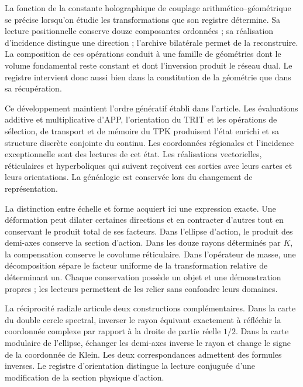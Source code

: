 \label{x_reciprocidad:rec:apertura}

La fonction de la constante holographique de couplage arithmético--géométrique se précise lorsqu'on étudie les transformations que son registre détermine. Sa lecture positionnelle conserve douze composantes ordonnées ; sa réalisation d'incidence distingue une direction ; l'archive bilatérale permet de la reconstruire. La composition de ces opérations conduit à une famille de géométries dont le volume fondamental reste constant et dont l'inversion produit le réseau dual. Le registre intervient donc aussi bien dans la constitution de la géométrie que dans sa récupération.

Ce développement maintient l’ordre génératif établi dans l’article. Les évaluations additive et multiplicative d’APP, l’orientation du TRIT et les opérations de sélection, de transport et de mémoire du TPK produisent l’état enrichi et sa structure discrète conjointe du continu. Les coordonnées régionales et l’incidence exceptionnelle sont des lectures de cet état. Les réalisations vectorielles, réticulaires et hyperboliques qui suivent reçoivent ces sorties avec leurs cartes et leurs orientations. La généalogie est conservée lors du changement de représentation.

La distinction entre échelle et forme acquiert ici une expression exacte. Une déformation peut dilater certaines directions et en contracter d’autres tout en conservant le produit total de ses facteurs. Dans l’ellipse d’action, le produit des demi-axes conserve la section d’action. Dans les douze rayons déterminés par \(K\), la compensation conserve le covolume réticulaire. Dans l’opérateur de masse, une décomposition sépare le facteur uniforme de la transformation relative de déterminant un. Chaque conservation possède un objet et une démonstration propres ; les lecteurs permettent de les relier sans confondre leurs domaines.

La réciprocité radiale articule deux constructions complémentaires. Dans la carte du double cercle spectral, inverser le rayon équivaut exactement à réfléchir la coordonnée complexe par rapport à la droite de partie réelle \(1/2\). Dans la carte modulaire de l'ellipse, échanger les demi-axes inverse le rayon et change le signe de la coordonnée de Klein. Les deux correspondances admettent des formules inverses. Le registre d'orientation distingue la lecture conjuguée d'une modification de la section physique d'action.

